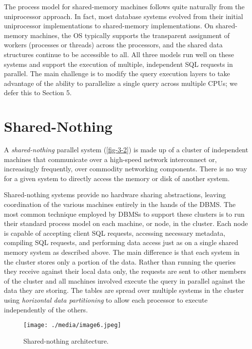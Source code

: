 \documentclass[a4paper,11pt,twoside,openright]{book}
\begin{document}
The process model for shared-memory machines follows quite naturally
from the uniprocessor approach. In fact, most database systems evolved
from their initial uniprocessor implementations to shared-memory
implementations. On shared-memory machines, the OS typically supports
the transparent assignment of workers (processes or
threads) across the processors, and the shared data structures continue
to be accessible to all. All three models run well on these systems and
support the execution of multiple, independent SQL requests in parallel.
The main challenge is to modify the query execution layers to take
advantage of the ability to parallelize a single query across multiple
CPUs; we defer this to Section 5.

\hypertarget{shared-nothing}{%
\section{Shared-Nothing}\label{shared-nothing}}

A \emph{shared-nothing} parallel system (\autoref{fig-3-2}) is made up of a
cluster of independent machines that communicate over a high-speed
network interconnect or, increasingly frequently, over commodity
networking components. There is no way for a given system to directly
access the memory or disk of another system.

Shared-nothing systems provide no hardware sharing abstractions, leaving
coordination of the various machines entirely in the hands of the DBMS.
The most common technique employed by DBMSs to support these clusters is
to run their standard process model on each machine, or node, in the
cluster. Each node is capable of accepting client SQL
requests, accessing necessary metadata, compiling SQL requests, and
performing data access just as on a single shared memory system as
described above. The main difference is that each system in the cluster
stores only a portion of the data. Rather than running the queries they
receive against their local data only, the requests are sent to other
members of the cluster and all machines involved execute the query in
parallel against the data they are storing. The tables are spread over
multiple systems in the cluster using \emph{horizontal data
partitioning} to allow each processor to execute independently of the
others.

\begin{figure}
\centering
\texttt{[image: ./media/image6.jpeg]}

\caption{Shared-nothing architecture.\label{fig-3-2}}
\end{figure}
\end{document}

